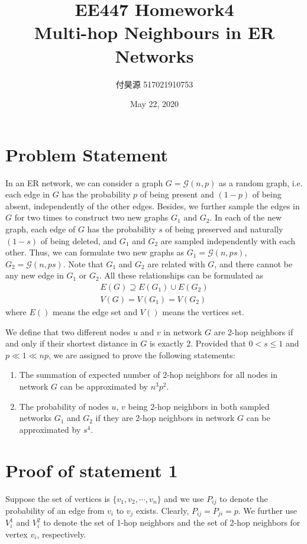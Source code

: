 \documentclass{article}
\title{\textbf{EE447 Homework4 \\ Multi-hop Neighbours in ER Networks}}
\author{付昊源 517021910753}
\date{May 22, 2020}
\begin{document}
\maketitle

\section*{Problem Statement}
In an ER network, we can consider a graph $G=\mathcal{G} (n, p)$ as a random graph, i.e. each edge in $G$ has the probability $p$ of being present and $(1-p)$ of being absent, independently of the other edges. Besides, we further sample the edges in $G$ for two times to construct two new graphs $G_1$ and $G_2$. In each of the new graph, each edge of $G$ has the probability $s$ of being preserved and naturally $(1-s)$ of being deleted, and $G_1$ and $G_2$ are sampled independently with each other. Thus, we can formulate two new graphs as $G_1=\mathcal{G}(n, ps)$, $G_2=\mathcal{G}(n, ps)$. Note that $G_1$ and $G_2$ are related with $G$, and there cannot be any new edge in $G_1$ or $G_2$. All these relationships can be formulated as
\begin{equation}
    \begin{aligned}
    E(G) \supseteq E(G_1) \cup E(G_2) \\
    V(G)=V(G_1)=V(G_2)
    \end{aligned}
\end{equation}
where $E()$ means the edge set and $V()$ means the vertices set.

We define that two different nodes $u$ and $v$ in network $G$ are 2-hop neighbors if and only if their shortest distance in $G$ is exactly 2. Provided that $0 < s \le 1$ and $p \ll 1 \ll np$, we are assigned to prove the following statements:
\begin{enumerate}
    \item The summation of expected number of 2-hop neighbors for all nodes in network $G$ can be approximated by $n^3p^2$.
    \item The probability of nodes $u$, $v$ being 2-hop neighbors in both sampled networks $G_1$ and $G_2$ if they are 2-hop neighbors in network $G$ can be approximated by $s^4$.
\end{enumerate}

\section*{Proof of statement 1}
Suppose the set of vertices is $\{v_1, v_2, \cdots, v_n\}$ and we use $P_{ij}$ to denote the probability of an edge from $v_i$ to $v_j$ exists. Clearly, $P_{ij}=P_{ji}=p$. We further use $V_i^1$ and $V_i^2$ to denote the set of 1-hop neighbors and the set of 2-hop neighbors for vertex $v_i$, respectively.
\end{document}
